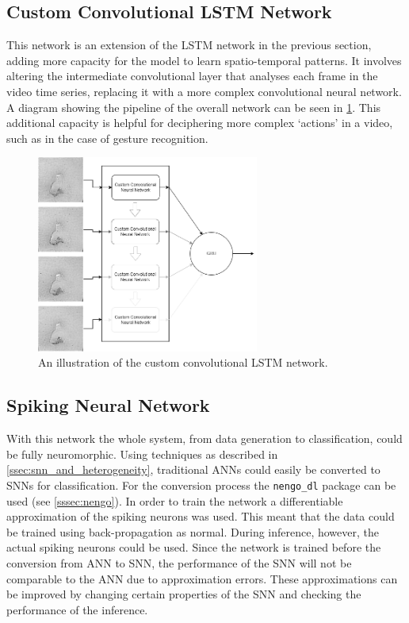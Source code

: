 \subsection{Custom Convolutional LSTM Network}

This network is an extension of the LSTM network in the previous section, adding more capacity for the model to learn spatio-temporal patterns. It involves altering the intermediate convolutional layer that analyses each frame in the video time series, replacing it with a more complex convolutional neural network. A diagram showing the pipeline of the overall network can be seen in \cref{fig:custom_conv_lstm_pipeline}. This additional capacity is helpful for deciphering more complex `actions' in a video, such as in the case of gesture recognition.

\begin{figure}[htb]
    \centering
    \includegraphics[width=0.65\textwidth]{analysisanddesign/images/custom_conv_lstm_pipeline.png}
    \caption{An illustration of the custom convolutional LSTM network.}
    \label{fig:custom_conv_lstm_pipeline}
\end{figure}

\subsection{Spiking Neural Network} \label{ssec:snn_design}

With this network the whole system, from data generation to classification, could be fully neuromorphic. Using techniques as described in \cref{ssec:snn_and_heterogeneity}, traditional ANNs could easily be converted to SNNs\cite{Ann2Snn} for classification. For the conversion process the \lstinline{nengo_dl} package can be used (see \cref{sssec:nengo}). In order to train the network a differentiable approximation of the spiking neurons was used. This meant that the data could be trained using back-propagation as normal. During inference, however, the actual spiking neurons could be used\cite{TrainingSnn}. Since the network is trained before the conversion from ANN to SNN, the performance of the SNN will not be comparable to the ANN due to approximation errors. These approximations can be improved by changing certain properties of the SNN and checking the performance of the inference.

